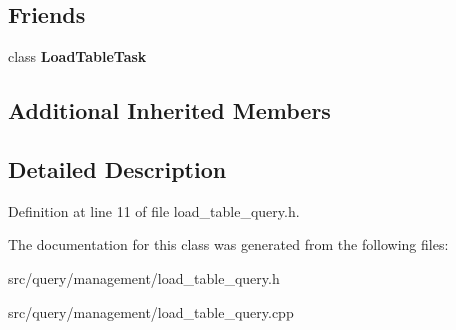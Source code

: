 \subsection*{Friends}
\begin{DoxyCompactItemize}
\item 
\mbox{\label{class_load_table_query_aaa7e070e4fcb870c5276bcb77f249378}} 
class {\bfseries Load\+Table\+Task}
\end{DoxyCompactItemize}
\subsection*{Additional Inherited Members}


\subsection{Detailed Description}


Definition at line 11 of file load\+\_\+table\+\_\+query.\+h.



The documentation for this class was generated from the following files\+:\begin{DoxyCompactItemize}
\item 
src/query/management/load\+\_\+table\+\_\+query.\+h\item 
src/query/management/load\+\_\+table\+\_\+query.\+cpp\end{DoxyCompactItemize}
